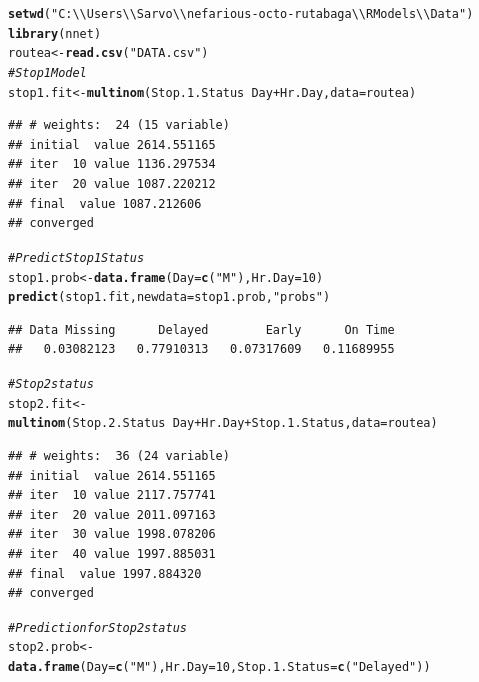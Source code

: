 \documentclass[12pt]{article}\usepackage[]{graphicx}\usepackage[]{color}
\makeatletter
\newcommand{\hlnum}[1]{\textcolor[rgb]{0.686,0.059,0.569}{#1}}%
\newcommand{\hlstr}[1]{\textcolor[rgb]{0.192,0.494,0.8}{#1}}%
\newcommand{\hlcom}[1]{\textcolor[rgb]{0.678,0.584,0.686}{\textit{#1}}}%
\newcommand{\hlopt}[1]{\textcolor[rgb]{0,0,0}{#1}}%
\newcommand{\hlstd}[1]{\textcolor[rgb]{0.345,0.345,0.345}{#1}}%
\newcommand{\hlkwb}[1]{\textcolor[rgb]{0.69,0.353,0.396}{#1}}%
\newcommand{\hlkwc}[1]{\textcolor[rgb]{0.333,0.667,0.333}{#1}}%
\newcommand{\hlkwd}[1]{\textcolor[rgb]{0.737,0.353,0.396}{\textbf{#1}}}%
\newenvironment{kframe}{%
 \def\at@end@of@kframe{}%
 \ifinner\ifhmode%
  \def\at@end@of@kframe{\end{minipage}}%
  \begin{minipage}{\columnwidth}%
 \fi\fi%
 \def\FrameCommand##1{\hskip\@totalleftmargin \hskip-\fboxsep
 \colorbox{shadecolor}{##1}\hskip-\fboxsep
     \hskip-\linewidth \hskip-\@totalleftmargin \hskip\columnwidth}%
 \MakeFramed {\advance\hsize-\width
   \@totalleftmargin\z@ \linewidth\hsize
   \@setminipage}}%
 {\par\unskip\endMakeFramed%
 \at@end@of@kframe}
\newenvironment{knitrout}{}{} %
\makeatother
\begin{document}
\begin{knitrout}
\color{fgcolor}\begin{kframe}
\begin{alltt}
\hlkwd{setwd}\hlstd{(}\hlstr{"C:\textbackslash{}\textbackslash{}Users\textbackslash{}\textbackslash{}Sarvo\textbackslash{}\textbackslash{}nefarious-octo-rutabaga\textbackslash{}\textbackslash{}R Models\textbackslash{}\textbackslash{}Data"}\hlstd{)}
\hlkwd{library}\hlstd{(nnet)}
\hlstd{routea}\hlkwb{<-}\hlkwd{read.csv}\hlstd{(}\hlstr{"DATA.csv"}\hlstd{)}
\hlcom{# Stop 1 Model}
\hlstd{stop1.fit}\hlkwb{<-}\hlkwd{multinom}\hlstd{(Stop.1.Status}\hlopt{~}\hlstd{Day}\hlopt{+}\hlstd{Hr.Day,}\hlkwc{data}\hlstd{=routea)}
\end{alltt}
\begin{verbatim}
## # weights:  24 (15 variable)
## initial  value 2614.551165 
## iter  10 value 1136.297534
## iter  20 value 1087.220212
## final  value 1087.212606 
## converged
\end{verbatim}
\begin{alltt}
\hlcom{# Predict Stop 1 Status}
\hlstd{stop1.prob}\hlkwb{<-}\hlkwd{data.frame}\hlstd{(}\hlkwc{Day}\hlstd{=}\hlkwd{c}\hlstd{(}\hlstr{"M"}\hlstd{),}\hlkwc{Hr.Day}\hlstd{=}\hlnum{10}\hlstd{)}
\hlkwd{predict}\hlstd{(stop1.fit,}\hlkwc{newdata} \hlstd{= stop1.prob,}\hlstr{"probs"}\hlstd{)}
\end{alltt}
\begin{verbatim}
## Data Missing      Delayed        Early      On Time 
##   0.03082123   0.77910313   0.07317609   0.11689955
\end{verbatim}
\begin{alltt}
\hlcom{#Stop 2 status}
\hlstd{stop2.fit}\hlkwb{<-}\hlkwd{multinom}\hlstd{(Stop.2.Status}\hlopt{~}\hlstd{Day}\hlopt{+}\hlstd{Hr.Day}\hlopt{+}\hlstd{Stop.1.Status,}\hlkwc{data}\hlstd{=routea)}
\end{alltt}
\begin{verbatim}
## # weights:  36 (24 variable)
## initial  value 2614.551165 
## iter  10 value 2117.757741
## iter  20 value 2011.097163
## iter  30 value 1998.078206
## iter  40 value 1997.885031
## final  value 1997.884320 
## converged
\end{verbatim}
\begin{alltt}
\hlcom{#Prediction for Stop 2 status}
\hlstd{stop2.prob}\hlkwb{<-}\hlkwd{data.frame}\hlstd{(}\hlkwc{Day}\hlstd{=}\hlkwd{c}\hlstd{(}\hlstr{"M"}\hlstd{),}\hlkwc{Hr.Day}\hlstd{=}\hlnum{10}\hlstd{,}\hlkwc{Stop.1.Status}\hlstd{=}\hlkwd{c}\hlstd{(}\hlstr{"Delayed"}\hlstd{))}

\end{alltt}
\end{kframe}
\end{knitrout}
\end{document}
